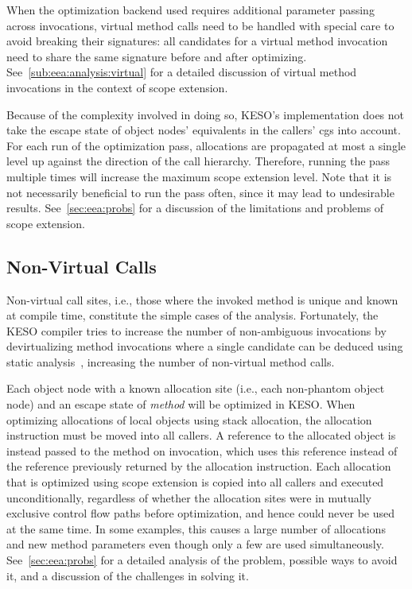 		When the optimization backend used requires additional parameter passing across invocations, virtual method calls
		need to be handled with special care to avoid breaking their signatures: all candidates for a virtual method
		invocation need to share the same signature before and after optimizing. See~\cref{sub:eea:analysis:virtual} for
		a detailed discussion of virtual method invocations in the context of scope extension.

		Because of the complexity involved in doing so, KESO's implementation does not take the escape state of object
		nodes' equivalents in the callers' \glspl{cg} into account. For each run of the optimization pass, allocations are
		propagated at most a single level up against the direction of the call hierarchy. Therefore, running the pass
		multiple times will increase the maximum scope extension level. Note that it is not necessarily beneficial to run
		the pass often, since it may lead to undesirable results. See~\cref{sec:eea:probs} for a discussion of the
		limitations and problems of scope extension.

		\subsection{Non-Virtual Calls}
			\label{sub:eea:analysis:nonvirtual}
			Non-virtual call sites, i.e., those where the invoked method is unique and known at compile time, constitute the
			simple cases of the analysis. Fortunately, the KESO compiler tries to increase the number of non-ambiguous
			invocations by devirtualizing method invocations where a single candidate can be deduced using static
			analysis~\cite[Sec.~3.4]{erhardt:11:jtres}, increasing the number of non-virtual method calls.

			Each object node with a known allocation site (i.e., each non-phantom object node) and an escape state of
			\emph{method} will be optimized in KESO\@. When optimizing allocations of local objects using stack allocation,
			the allocation instruction must be moved into all callers. A reference to the allocated object is instead passed
			to the method on invocation, which uses this reference instead of the reference previously returned by the
			allocation instruction. Each allocation that is optimized using scope extension is copied into all callers and
			executed unconditionally, regardless of whether the allocation sites were in mutually exclusive control flow paths
			before optimization, and hence could never be used at the same time. In some examples, this causes a large number
			of allocations and new method parameters even though only a few are used simultaneously. See~\cref{sec:eea:probs}
			for a detailed analysis of the problem, possible ways to avoid it, and a discussion of the challenges in solving
			it.

